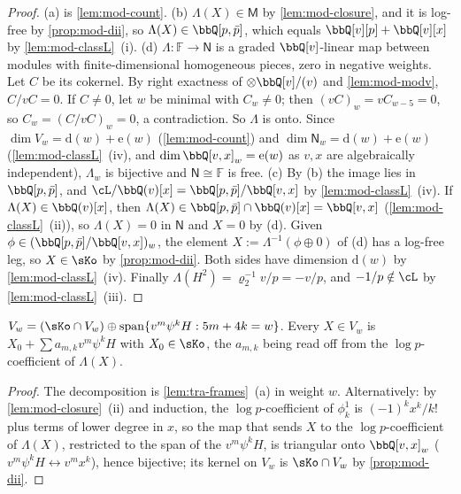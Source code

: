 \begin{proof}
(a) is \cref{lem:mod-count}. (b) $\Lambda(X)\in\mathsf M$ by \cref{lem:mod-closure}, and it is log-free by \cref{prop:mod-dii}, so $\Lambda(X)\in\bbQ[p,\bar p]$, which equals $\bbQ[v][p]+\bbQ[v][x]$ by \cref{lem:mod-classL}~(i). (d) $\Lambda\colon\mathbb F\to\mathsf N$ is a graded $\bbQ[v]$-linear map between modules with finite-dimensional homogeneous pieces, zero in negative weights. Let $C$ be its cokernel. By right exactness of $\otimes\bbQ[v]/(v)$ and \cref{lem:mod-modv}, $C/vC=0$. If $C\neq 0$, let $w$ be minimal with $C_w\neq 0$; then $(vC)_w=vC_{w-5}=0$, so $C_w=(C/vC)_w=0$, a contradiction. So $\Lambda$ is onto. Since $\dim V_w=\mathrm d(w)+\mathrm e(w)$ (\cref{lem:mod-count}) and $\dim\mathsf N_w=\mathrm d(w)+\mathrm e(w)$ (\cref{lem:mod-classL}~(iv), and $\dim\bbQ[v,x]_w=\mathrm e(w)$ as $v,x$ are algebraically independent), $\Lambda_w$ is bijective and $\mathsf N\cong\mathbb F$ is free. (c) By (b) the image lies in $\bbQ[p,\bar p]$, and $\cL/\bbQ(v)[x]=\bbQ[p,\bar p]/\bbQ[v,x]$ by \cref{lem:mod-classL}~(iv). If $\Lambda(X)\in\bbQ(v)[x]$, then $\Lambda(X)\in\bbQ[p,\bar p]\cap\bbQ(v)[x]=\bbQ[v,x]$ (\cref{lem:mod-classL}~(ii)), so $\Lambda(X)=0$ in $\mathsf N$ and $X=0$ by (d). Given $\phi\in(\bbQ[p,\bar p]/\bbQ[v,x])_w$, the element $X:=\Lambda^{-1}(\phi\oplus 0)$ of (d) has a log-free leg, so $X\in\sKo$ by \cref{prop:mod-dii}. Both sides have dimension $\mathrm d(w)$ by \cref{lem:mod-classL}~(iv). Finally $\Lambda(H^2)=\varrho_2^{-1}v/p=-v/p$, and $-1/p\notin\cL$ by \cref{lem:mod-classL}~(iii).
\end{proof}

\begin{cor}[Splitting of $V_w$]
\label{cor:mod-split}
$V_w=(\sKo\cap V_w)\oplus\operatorname{span}\{v^m\psi^kH:5m+4k=w\}$. Every $X\in V_w$ is $X_0+\sum a_{m,k}v^m\psi^kH$ with $X_0\in\sKo$, the $a_{m,k}$ being read off from the $\log p$-coefficient of $\Lambda(X)$.
\end{cor}

\begin{proof}
The decomposition is \cref{lem:tra-frames}~(a) in weight $w$. Alternatively: by \cref{lem:mod-closure}~(ii) and induction, the $\log p$-coefficient of $\phi^1_k$ is $(-1)^kx^k/k!$ plus terms of lower degree in $x$, so the map that sends $X$ to the $\log p$-coefficient of $\Lambda(X)$, restricted to the span of the $v^m\psi^kH$, is triangular onto $\bbQ[v,x]_w$ ($v^m\psi^kH\leftrightarrow v^mx^k$), hence bijective; its kernel on $V_w$ is $\sKo\cap V_w$ by \cref{prop:mod-dii}.
\end{proof}

